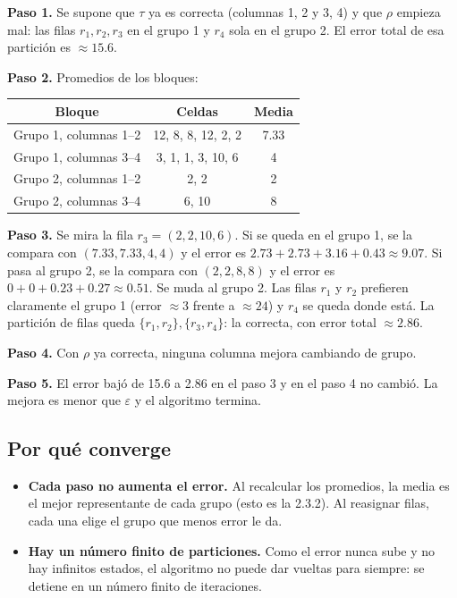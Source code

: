 \documentclass[11pt,a4paper]{article}
\begin{document}
\textbf{Paso 1.} Se supone que $\tau$ ya es correcta (columnas 1, 2 y 3, 4) y que
$\rho$ empieza mal: las filas $r_1,r_2,r_3$ en el grupo 1 y $r_4$ sola en el
grupo 2. El error total de esa partición es $\approx\mathbf{15.6}$.

\textbf{Paso 2.} Promedios de los bloques:
\begin{center}
\begin{tabular}{ccc}
\toprule
Bloque & Celdas & Media \\
\midrule
Grupo 1, columnas 1--2 & 12, 8, 8, 12, 2, 2 & 7.33 \\
Grupo 1, columnas 3--4 & 3, 1, 1, 3, 10, 6 & 4 \\
Grupo 2, columnas 1--2 & 2, 2 & 2 \\
Grupo 2, columnas 3--4 & 6, 10 & 8 \\
\bottomrule
\end{tabular}
\end{center}

\textbf{Paso 3.} Se mira la fila $r_3=(2,2,10,6)$. Si se queda en el grupo 1, se
la compara con $(7.33,7.33,4,4)$ y el error es $2.73+2.73+3.16+0.43\approx
\mathbf{9.07}$. Si pasa al grupo 2, se la compara con $(2,2,8,8)$ y el error es
$0+0+0.23+0.27\approx\mathbf{0.51}$. Se muda al grupo 2. Las filas $r_1$ y $r_2$
prefieren claramente el grupo 1 (error $\approx3$ frente a $\approx24$) y $r_4$ se
queda donde está. La partición de filas queda $\{r_1,r_2\},\{r_3,r_4\}$: la
correcta, con error total $\approx\mathbf{2.86}$.

\textbf{Paso 4.} Con $\rho$ ya correcta, ninguna columna mejora cambiando de grupo.

\textbf{Paso 5.} El error bajó de 15.6 a 2.86 en el paso 3 y en el paso 4 no
cambió. La mejora es menor que $\varepsilon$ y el algoritmo termina.

\subsection{Por qué converge}

\begin{itemize}
  \item \textbf{Cada paso no aumenta el error.} Al recalcular los promedios, la
  media es el mejor representante de cada grupo (esto es la 2.3.2). Al reasignar
  filas, cada una elige el grupo que menos error le da.
  \item \textbf{Hay un número finito de particiones.} Como el error nunca sube y
  no hay infinitos estados, el algoritmo no puede dar vueltas para siempre: se
  detiene en un número finito de iteraciones.
\end{itemize}
\end{document}
